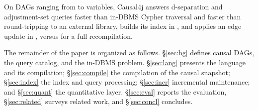 On DAGs ranging from  to  variables, Causal4j
answers d-separation and adjustment-set queries  faster than
in-DBMS Cypher traversal and  faster than round-tripping to an
external library, builds its index in , and applies an edge
update in , versus  for a full recompilation.


The remainder of the paper is organized as follows. \S\ref{sec:bg} defines
causal DAGs, the query catalog, and the in-DBMS problem. \S\ref{sec:lang}
presents the language and its compilation; \S\ref{sec:compile} the compilation
of the causal snapshot; \S\ref{sec:index} the index and query processing;
\S\ref{sec:incr} incremental maintenance; and \S\ref{sec:quant} the quantitative
layer. \S\ref{sec:eval} reports the evaluation, \S\ref{sec:related} surveys
related work, and \S\ref{sec:concl} concludes.
